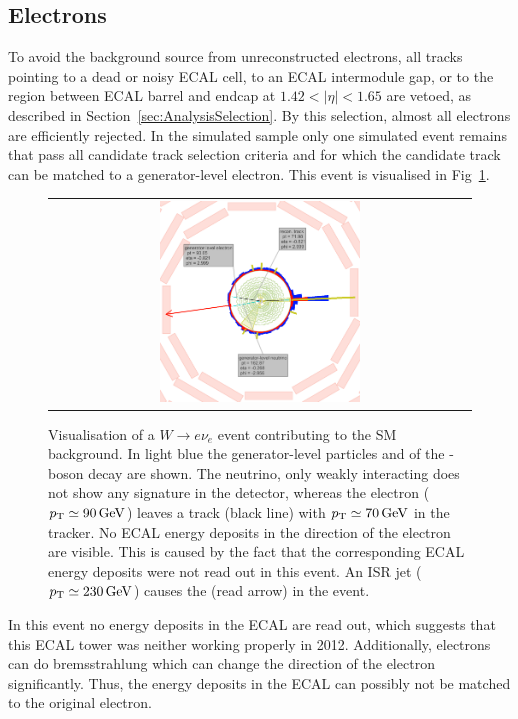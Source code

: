 \subsection*{Electrons}
To avoid the background source from unreconstructed electrons, all tracks pointing to a dead or noisy ECAL cell, to an ECAL intermodule gap, or to the region between ECAL barrel and endcap at $1.42<|\eta|<1.65$ are vetoed, 
as described in Section~\ref{sec:AnalysisSelection}.
By this selection, almost all electrons are efficiently rejected.
In the simulated \WJets sample only one simulated event remains that pass all candidate track selection criteria and for which the candidate track can be matched to a generator-level electron.
This event is visualised in Fig~\ref{fig:LostElectron}. 
\begin{figure}[!t]
  \centering 
  \begin{tabular}{c}
    \includegraphics[width=0.49\textwidth]{figures/analysis/Electron_lumi_279317_event_111637553.png}
  \end{tabular}
 \caption{Visualisation of a $W\rightarrow e\nu_e$ event contributing to the SM background. 
           In light blue the generator-level particles \lel and \nue of the \W-boson decay are shown. 
           The neutrino, only weakly interacting does not show any signature in the detector, whereas the electron ($p_{\text{T}}\simeq 90\,\text{Ge}\kern-0.06667em\text{V}$) leaves a track (black line) with \mbox{$p_{\text{T}}\simeq 70\,\text{Ge}\kern-0.06667em\text{V}$} in the tracker. 
           No ECAL energy deposits in the direction of the electron are visible. 
           This is caused by the fact that the corresponding ECAL energy deposits were not read out in this event.
           An ISR jet ($p_{\text{T}}\simeq 230\,\text{Ge}\kern-0.06667em\text{V}$) causes the \met (read arrow) in the event. }
  \label{fig:LostElectron}
\end{figure}
 
In this event no energy deposits in the ECAL are read out, which suggests that this ECAL tower was neither working properly in 2012.
Additionally, electrons can do bremsstrahlung which can change the direction of the electron significantly.
Thus, the energy deposits in the ECAL can possibly not be matched to the original electron.

